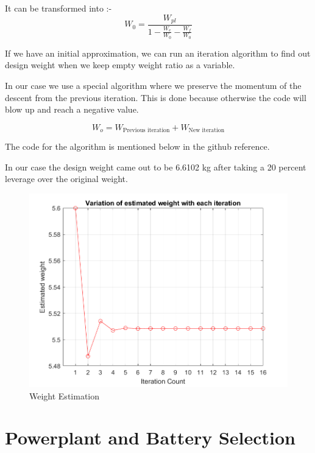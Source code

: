 \documentclass[12 pt]{article}
\begin{document}
It can be transformed into :- 
$$W_{0} = \frac{W_{pl}}{1 - \frac{W_{e}}{W_{0}} - \frac{W_{f}}{W_0}}$$

If we have an initial approximation, we can run an iteration algorithm to find out design weight when we keep empty weight ratio as a variable.


In our case we use a special algorithm where we preserve the momentum of the descent from the previous iteration. This is done because otherwise the code will blow up and reach a negative value. 

$$ W_o = W_{\text{Previous iteration}} + W_{\text{New iteration}} $$

The code for the algorithm is mentioned below in the github reference.

In our case the design weight came out to be 6.6102 kg after taking a 20 percent leverage over the original weight.

\begin{figure}
    \centering
    \includegraphics[width=0.75\linewidth]{Codes/Week 2/weight.png}
    \caption{Weight Estimation}
    \label{Weight Estimation}
\end{figure}

\vfill

\newpage

\section{Powerplant and Battery Selection}
\end{document}
